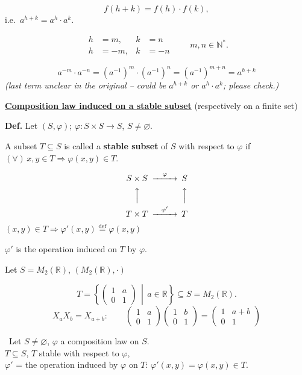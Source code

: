 \[
f(h+k) = f(h)\cdot f(k),
\]
i.e.\ $a^{h+k} = a^h \cdot a^k$.

\[
\begin{aligned}
h&=m, & k&=n\\
h&=-m, & k&=-n
\end{aligned}
\qquad m,n\in\mathbb{N}^*.
\]

\[
a^{-m}\cdot a^{-n} = (a^{-1})^{m}\cdot(a^{-1})^{n} = (a^{-1})^{m+n} = a^{h+k}
\]
\noindent\textit{(last term unclear in the original -- could be $a^{h+k}$ or $a^h\cdot a^k$; please check.)}

\bigskip
\noindent\underline{\textbf{Composition law induced on a stable subset}} (respectively on a finite set)

\bigskip
\noindent\textbf{Def.} Let $(S,\varphi)$; $\varphi : S\times S \to S$, $S \neq \varnothing$.

\noindent A subset $T \subseteq S$ is called a \textbf{stable subset} of $S$ with respect to $\varphi$ if $(\forall)\, x,y \in T \Rightarrow \varphi(x,y) \in T$.

\[
\begin{CD}
S\times S @>\varphi>> S\\
@AAA @AAA\\
T\times T @>\varphi'>> T
\end{CD}
\]
\noindent $(x,y)\in T \Rightarrow \varphi'(x,y) \overset{\text{def}}{=} \varphi(x,y)$

\noindent $\varphi'$ is the operation induced on $T$ by $\varphi$.

\noindent Let $S = M_2(\mathbb{R})$, $(M_2(\mathbb{R}),\cdot)$

\[
T = \left\{ \begin{pmatrix} 1 & a \\ 0 & 1 \end{pmatrix} \,\middle|\, a\in\mathbb{R} \right\} \subseteq S = M_2(\mathbb{R}).
\]
\[
X_a X_b = X_{a+b}: \qquad \begin{pmatrix}1 & a\\ 0 & 1\end{pmatrix}\begin{pmatrix}1 & b\\ 0 & 1\end{pmatrix} = \begin{pmatrix}1 & a+b\\ 0 & 1\end{pmatrix}
\]

\bigskip
\noindent{} \ Let $S\neq\varnothing$, $\varphi$ a composition law on $S$.\\
$T\subseteq S$, $T$ stable with respect to $\varphi$,\\
$\varphi'$ = the operation induced by $\varphi$ on $T$: $\varphi'(x,y)=\varphi(x,y)\in T$.

